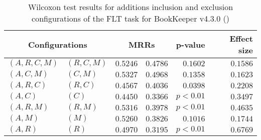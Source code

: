 
\begin{table}
\begin{spacing}{1.2}
\centering
\caption{Wilcoxon test results for additions inclusion and exclusion configurations of the FLT task for BookKeeper v4.3.0 (\ctwo)}
\label{table:versus-wilcox-bookkeeper-flt-additions}
\begin{tabular}{ll|rr|rr}
\toprule
      \multicolumn{2}{c|}{Configurations} &                \multicolumn{2}{c|}{MRRs} &        p-value & Effect size \\
\midrule
 $(A,R,C,M)$ &  $(R,C,M)$ &  $\bm{0.5246}$ &  $0.4786$ & $0.1602$ &    $0.1586$ \\
   $(A,C,M)$ &    $(C,M)$ &  $\bm{0.5327}$ &  $0.4968$ & $0.1358$ &    $0.1623$ \\
   $(A,R,C)$ &    $(R,C)$ &  $\bm{0.4567}$ &  $0.4036$ & $0.0398$ &    $0.2208$ \\
     $(A,C)$ &      $(C)$ &  $\bm{0.4450}$ &  $0.3366$ & $p<0.01$ &    $0.3497$ \\
   $(A,R,M)$ &    $(R,M)$ &  $\bm{0.5316}$ &  $0.3978$ & $p<0.01$ &    $0.4635$ \\
     $(A,M)$ &      $(M)$ &  $\bm{0.5260}$ &  $0.3826$ & $0.1016$ &    $0.1744$ \\
     $(A,R)$ &      $(R)$ &  $\bm{0.4970}$ &  $0.3195$ & $p<0.01$ &    $0.6769$ \\
\bottomrule
\end{tabular}

\end{spacing}
\end{table}

